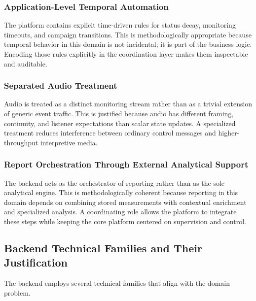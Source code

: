\documentclass[11pt,a4paper]{article}
\begin{document}
\subsubsection{Application-Level Temporal Automation}
The platform contains explicit time-driven rules for status decay, monitoring timeouts, and campaign transitions. This is methodologically appropriate because temporal behavior in this domain is not incidental; it is part of the business logic. Encoding those rules explicitly in the coordination layer makes them inspectable and auditable.

\subsubsection{Separated Audio Treatment}
Audio is treated as a distinct monitoring stream rather than as a trivial extension of generic event traffic. This is justified because audio has different framing, continuity, and listener expectations than scalar state updates. A specialized treatment reduces interference between ordinary control messages and higher-throughput interpretive media.

\subsubsection{Report Orchestration Through External Analytical Support}
The backend acts as the orchestrator of reporting rather than as the sole analytical engine. This is methodologically coherent because reporting in this domain depends on combining stored measurements with contextual enrichment and specialized analysis. A coordinating role allows the platform to integrate these steps while keeping the core platform centered on supervision and control.

\subsection{Backend Technical Families and Their Justification}
The backend employs several technical families that align with the domain problem.
\end{document}
